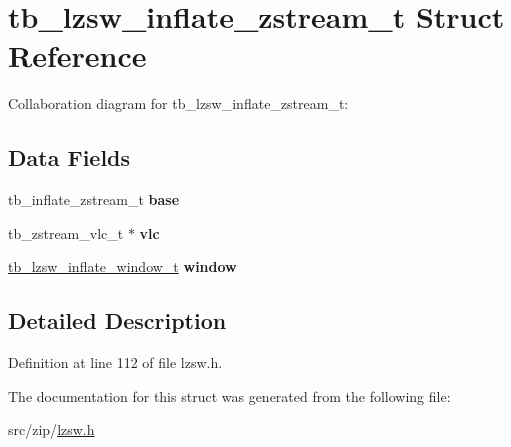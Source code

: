 \hypertarget{structtb__lzsw__inflate__zstream__t}{\section{tb\-\_\-lzsw\-\_\-inflate\-\_\-zstream\-\_\-t Struct Reference}
\label{d6/ddc/structtb__lzsw__inflate__zstream__t}
}


Collaboration diagram for tb\-\_\-lzsw\-\_\-inflate\-\_\-zstream\-\_\-t\-:
\subsection*{Data Fields}
\begin{DoxyCompactItemize}
\item 
\hypertarget{structtb__lzsw__inflate__zstream__t_ab027941009243ab655b2fd5d38402c73}{tb\-\_\-inflate\-\_\-zstream\-\_\-t {\bfseries base}}\label{d6/ddc/structtb__lzsw__inflate__zstream__t_ab027941009243ab655b2fd5d38402c73}

\item 
\hypertarget{structtb__lzsw__inflate__zstream__t_ab9b5dcf66c17840145feabefda28efe7}{tb\-\_\-zstream\-\_\-vlc\-\_\-t $\ast$ {\bfseries vlc}}\label{d6/ddc/structtb__lzsw__inflate__zstream__t_ab9b5dcf66c17840145feabefda28efe7}

\item 
\hypertarget{structtb__lzsw__inflate__zstream__t_a7263ac221cfdab0270c32bb634c13791}{\hyperlink{structtb__lzsw__inflate__window__t}{tb\-\_\-lzsw\-\_\-inflate\-\_\-window\-\_\-t} {\bfseries window}}\label{d6/ddc/structtb__lzsw__inflate__zstream__t_a7263ac221cfdab0270c32bb634c13791}

\end{DoxyCompactItemize}


\subsection{Detailed Description}


Definition at line 112 of file lzsw.\-h.



The documentation for this struct was generated from the following file\-:\begin{DoxyCompactItemize}
\item 
src/zip/\hyperlink{lzsw_8h}{lzsw.\-h}\end{DoxyCompactItemize}
